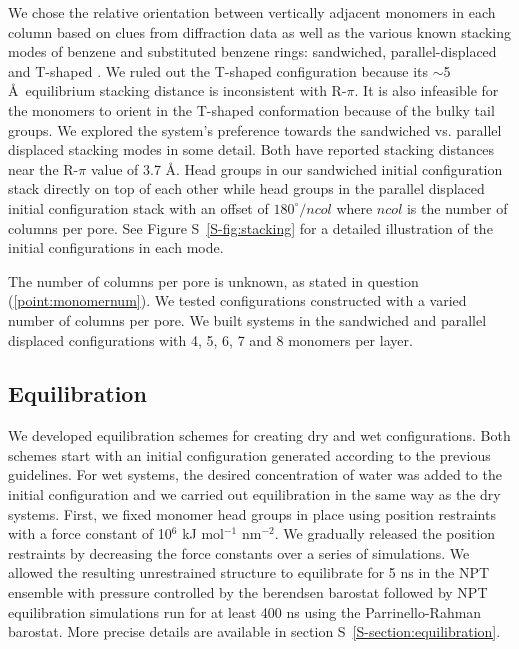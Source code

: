 \documentclass[journal=jpcbfk,manuscript=article]{achemso}
\begin{document}

  We chose the relative orientation between vertically adjacent monomers in each column 
  based on clues from diffraction data as well as the various known stacking modes of 
  benzene and substituted benzene rings: sandwiched, parallel-displaced and T-shaped
  \cite{sinnokrot_estimates_2002}. We ruled out the T-shaped configuration
  because its $\sim$5 \AA~equilibrium stacking distance \cite{sinnokrot_estimates_2002}
  is inconsistent with R-$\pi$. It is also infeasible for the monomers to orient in the 
  T-shaped conformation because of the bulky tail groups. We explored the system's 
  preference towards the sandwiched vs. parallel displaced stacking modes in some detail.
  Both have reported stacking distances near the R-$\pi$ value of 3.7 \AA. Head groups in
  our sandwiched initial configuration stack directly on top of each other while
  head groups in the parallel displaced initial configuration stack with an offset
  of $180^\circ/ncol$ where $ncol$ is the number of columns per pore. See Figure 
  S~\ref{S-fig:stacking} for a detailed illustration of the initial configurations in each mode.
  

  The number of columns per pore is unknown, as stated in question
  (\ref{point:monomernum}). We tested configurations constructed with a varied
  number of columns per pore. We built systems in the sandwiched and parallel
  displaced configurations with 4, 5, 6, 7 and 8 monomers per layer.

  \subsection{Equilibration}
  We developed equilibration schemes for creating dry and wet configurations. Both
  schemes start with an initial configuration generated according to the previous
  guidelines. For wet systems, the desired concentration of water was added to 
  the initial configuration and we carried out equilibration in the same way
  as the dry systems. First, we fixed monomer head groups in place using position
  restraints with a force constant of 10$^6$ kJ mol$^{-1}$ nm$^{-2}$. We gradually
  released the position restraints by decreasing the force constants over a series
  of simulations. We allowed the resulting unrestrained structure to equilibrate for
  5 ns in the NPT ensemble with pressure controlled by the berendsen barostat 
  followed by NPT equilibration simulations run for at least 400 ns using the 
  Parrinello-Rahman barostat. More precise details are available in 
  section S~\ref{S-section:equilibration}.
\end{document}
